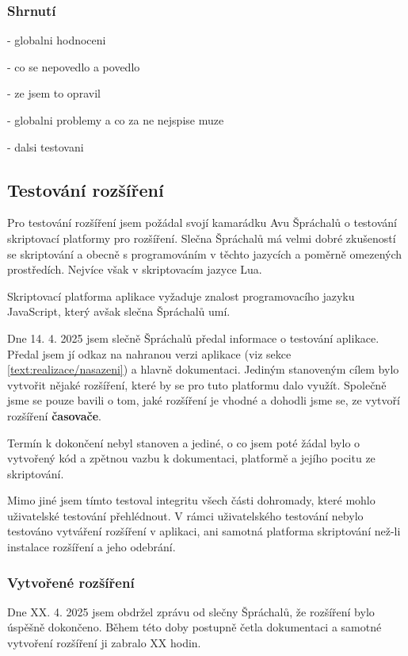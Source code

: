 \subsubsection{Shrnutí}

- globalni hodnoceni

- co se nepovedlo a povedlo

- ze jsem to opravil

- globalni problemy a co za ne nejspise muze

- dalsi testovani

\subsection{Testování rozšíření}

Pro testování rozšíření jsem požádal svojí kamarádku Avu Špráchalů o testování skriptovací platformy pro rozšíření.
Slečna Špráchalů má velmi dobré zkušeností se skriptování a obecně s programováním v těchto jazycích a poměrně omezených prostředích.
Nejvíce však v skriptovacím jazyce Lua.

Skriptovací platforma aplikace vyžaduje znalost programovacího jazyku JavaScript, který avšak slečna Špráchalů umí.

Dne 14. 4. 2025 jsem slečně Špráchalů předal informace o testování aplikace.
Předal jsem jí odkaz na nahranou verzi aplikace (viz sekce \ref{text:realizace/nasazeni}) a hlavně dokumentaci.
Jediným stanoveným cílem bylo vytvořit nějaké rozšíření, které by se pro tuto platformu dalo využít.
Společně jsme se pouze bavili o tom, jaké rozšíření je vhodné a dohodli jsme se, ze vytvoří rozšíření \textbf{časovače}.

Termín k dokončení nebyl stanoven a jediné, o co jsem poté žádal bylo o vytvořený kód a zpětnou vazbu k dokumentaci, platformě a jejího pocitu ze skriptování.

Mimo jiné jsem tímto testoval integritu všech části dohromady, které mohlo uživatelské testování přehlédnout.
V rámci uživatelského testování nebylo testováno vytváření rozšíření v aplikaci, ani samotná platforma skriptování než-li instalace rozšíření a jeho odebrání.

\subsubsection{Vytvořené rozšíření}

Dne XX. 4. 2025 jsem obdržel zprávu od slečny Špráchalů, že rozšíření bylo úspěšně dokončeno.
Během této doby postupně četla dokumentaci a samotné vytvoření rozšíření ji zabralo XX hodin.

